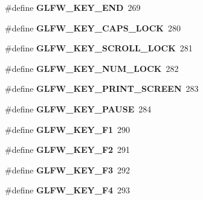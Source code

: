 \begin{DoxyCompactItemize}
\item 
\mbox{\label{group__keys_ga86587ea1df19a65978d3e3b8439bedd9}} 
\#define {\bfseries G\+L\+F\+W\+\_\+\+K\+E\+Y\+\_\+\+E\+ND}~269
\item 
\mbox{\label{group__keys_ga92c1d2c9d63485f3d70f94f688d48672}} 
\#define {\bfseries G\+L\+F\+W\+\_\+\+K\+E\+Y\+\_\+\+C\+A\+P\+S\+\_\+\+L\+O\+CK}~280
\item 
\mbox{\label{group__keys_gaf622b63b9537f7084c2ab649b8365630}} 
\#define {\bfseries G\+L\+F\+W\+\_\+\+K\+E\+Y\+\_\+\+S\+C\+R\+O\+L\+L\+\_\+\+L\+O\+CK}~281
\item 
\mbox{\label{group__keys_ga3946edc362aeff213b2be6304296cf43}} 
\#define {\bfseries G\+L\+F\+W\+\_\+\+K\+E\+Y\+\_\+\+N\+U\+M\+\_\+\+L\+O\+CK}~282
\item 
\mbox{\label{group__keys_gaf964c2e65e97d0cf785a5636ee8df642}} 
\#define {\bfseries G\+L\+F\+W\+\_\+\+K\+E\+Y\+\_\+\+P\+R\+I\+N\+T\+\_\+\+S\+C\+R\+E\+EN}~283
\item 
\mbox{\label{group__keys_ga8116b9692d87382afb5849b6d8907f18}} 
\#define {\bfseries G\+L\+F\+W\+\_\+\+K\+E\+Y\+\_\+\+P\+A\+U\+SE}~284
\item 
\mbox{\label{group__keys_gafb8d66c573acf22e364049477dcbea30}} 
\#define {\bfseries G\+L\+F\+W\+\_\+\+K\+E\+Y\+\_\+\+F1}~290
\item 
\mbox{\label{group__keys_ga0900750aff94889b940f5e428c07daee}} 
\#define {\bfseries G\+L\+F\+W\+\_\+\+K\+E\+Y\+\_\+\+F2}~291
\item 
\mbox{\label{group__keys_gaed7cd729c0147a551bb8b7bb36c17015}} 
\#define {\bfseries G\+L\+F\+W\+\_\+\+K\+E\+Y\+\_\+\+F3}~292
\item 
\mbox{\label{group__keys_ga9b61ebd0c63b44b7332fda2c9763eaa6}} 
\#define {\bfseries G\+L\+F\+W\+\_\+\+K\+E\+Y\+\_\+\+F4}~293
\item 
\mbox{\label{group__keys_gaf258dda9947daa428377938ed577c8c2}} 

\end{DoxyCompactItemize}

